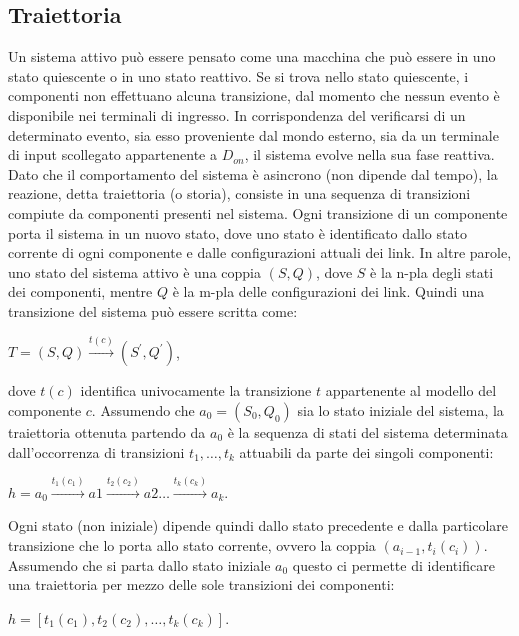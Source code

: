\subsection{Traiettoria}
Un sistema attivo può essere pensato come una macchina che può essere in uno stato quiescente o in uno stato reattivo. Se si trova nello stato quiescente, i componenti non effettuano alcuna transizione, dal momento che nessun evento è disponibile nei terminali di ingresso. In corrispondenza del verificarsi di un determinato evento, sia esso proveniente dal mondo esterno, sia da un terminale di input scollegato appartenente a $D_{on}$, il sistema evolve nella sua fase reattiva. Dato che il comportamento del sistema è asincrono (non dipende dal tempo), la reazione, detta traiettoria (o storia), consiste in una sequenza di transizioni compiute da componenti presenti nel sistema.
Ogni transizione di un componente porta il sistema in un nuovo stato, dove uno stato è identificato dallo stato corrente di ogni componente e dalle configurazioni attuali dei link. In altre parole, uno stato del sistema attivo è una coppia $(S,Q)$, dove $S$ è la n-pla degli stati dei componenti, mentre $Q$ è la m-pla delle configurazioni dei link.
Quindi una transizione del sistema può essere scritta come:
\begin{center}
	$T = (S,Q) \xrightarrow {t(c)} (S^\prime,Q^\prime)$,
\end{center}
dove $t(c)$ identifica univocamente la transizione $t$ appartenente al modello del componente $c$.
Assumendo che $a_0 = (S_0,Q_0)$ sia lo stato iniziale del sistema, la traiettoria ottenuta partendo da $a_0$ è la sequenza di stati del sistema determinata dall'occorrenza di transizioni $t_1, \ldots , t_k$ attuabili da parte dei singoli componenti:
\begin{center}
$h = a_0 \xrightarrow{t_1(c_1)} a1 \xrightarrow{t_2(c_2)} a2 \ldots \xrightarrow{t_k(c_k)} a_k$.
\end{center}

Ogni stato (non iniziale) dipende quindi dallo stato precedente e dalla particolare transizione che lo porta allo stato corrente, ovvero la coppia $(a_{i-1},t_i(c_i))$. Assumendo che si parta dallo stato iniziale $a_0$ questo ci permette di identificare una traiettoria per mezzo delle sole transizioni dei componenti:
\begin{center}
$h = [t_1(c_1),t_2(c_2), \ldots , t_k(c_k)]$.
\end{center}

